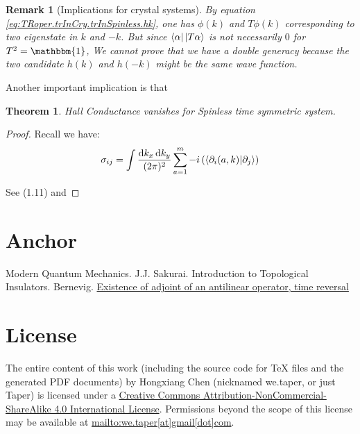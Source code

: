 \documentclass{article}
\newcommand*\diff{\mathop{}\!\mathrm{d}}
\numberwithin{equation}{subsection} %
\newtheorem{thm}{Theorem}[section]
\newtheorem{remark}{Remark}[section]
\theoremstyle{definition}
\begin{document}
        \begin{remark}[Implications for crystal systems]
            By equation \ref{eq:TRoper.trInCry.trInSpinless.hk}, one has
            $\phi(k)$ and $T\phi(k)$ corresponding to two eigenstate in
            $k$ and $-k$. But since $\bra{\alpha}\ket{T\alpha}$ is not
            necessarily $0$ for $T^2= \mathbbm{1}$, We cannot prove
            that we have a double generacy because the two candidate
            $h(k)$ and $h(-k)$ might be the same wave function.
        \end{remark}

        Another important implication is that
        \begin{thm}
            Hall Conductance vanishes for Spinless time
            symmetric system.  
        \end{thm}
        \begin{proof}
            Recall we have:
            \begin{align}
                \sigma_{ij} = \int \frac{\diff k_x\diff k_y}{(2\pi)^2}
                \sum_{a=1}^{m} -i \left(
                    \braket{\partial_i(a,k)|\partial_j}
                \right)
            \end{align}

            See (1.11) and 
        \end{proof}
        
        
\section{Anchor}
\label{sec:Anchor}
\begin{thebibliography}{1}
     Modern Quantum Mechanics. J.J. Sakurai.
     Introduction to Topological Insulators. Bernevig.
    \href{http://physics.stackexchange.com/questions/45227/existence-of-adjoint-of-an-antilinear-operator-time-reversal}{Existence of adjoint of an antilinear operator, time reversal}
\end{thebibliography}
\printnomenclature
\section{License}
The entire content of this work (including the source code
for TeX files and the generated PDF documents) by 
Hongxiang Chen (nicknamed we.taper, or just Taper) is
licensed under a 
\href{http://creativecommons.org/licenses/by-nc-sa/4.0/}{Creative 
Commons Attribution-NonCommercial-ShareAlike 4.0 International 
License}. Permissions beyond the scope of this 
license may be available at \url{mailto:we.taper[at]gmail[dot]com}.
\end{document}
